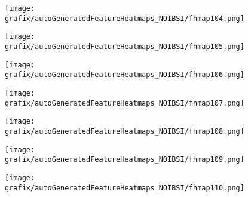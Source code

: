 \hspace{\hsp} 
\begin{subfigure}{\wid\textwidth} 
    \centering 
    \caption{\tiny \sffamily {}} 
    \vspace{\vsp} 
    \texttt{[image: grafix/autoGeneratedFeatureHeatmaps\_NOIBSI/fhmap104.png]} 
\end{subfigure} 
\hspace{\hsp} 
\begin{subfigure}{\wid\textwidth} 
    \centering 
    \caption{\tiny \sffamily {}} 
    \vspace{\vsp} 
    \texttt{[image: grafix/autoGeneratedFeatureHeatmaps\_NOIBSI/fhmap105.png]} 
\end{subfigure} 
\hspace{\hsp} 
\begin{subfigure}{\wid\textwidth} 
    \centering 
    \caption{\tiny \sffamily {}} 
    \vspace{\vsp} 
    \texttt{[image: grafix/autoGeneratedFeatureHeatmaps\_NOIBSI/fhmap106.png]} 
\end{subfigure} 
\hspace{\hsp} 
\begin{subfigure}{\wid\textwidth} 
    \centering 
    \caption{\tiny \sffamily {}} 
    \vspace{\vsp} 
    \texttt{[image: grafix/autoGeneratedFeatureHeatmaps\_NOIBSI/fhmap107.png]} 
\end{subfigure} 
\hspace{\hsp} 
\begin{subfigure}{\wid\textwidth} 
    \centering 
    \caption{\tiny \sffamily {}} 
    \vspace{\vsp} 
    \texttt{[image: grafix/autoGeneratedFeatureHeatmaps\_NOIBSI/fhmap108.png]} 
\end{subfigure} 
\hspace{\hsp} 
\begin{subfigure}{\wid\textwidth} 
    \centering 
    \caption{\tiny \sffamily {}} 
    \vspace{\vsp} 
    \texttt{[image: grafix/autoGeneratedFeatureHeatmaps\_NOIBSI/fhmap109.png]} 
\end{subfigure} 
\hspace{\hsp} 
\begin{subfigure}{\wid\textwidth} 
    \centering 
    \caption{\tiny \sffamily {}} 
    \vspace{\vsp} 
    \texttt{[image: grafix/autoGeneratedFeatureHeatmaps\_NOIBSI/fhmap110.png]} 
\end{subfigure} 
